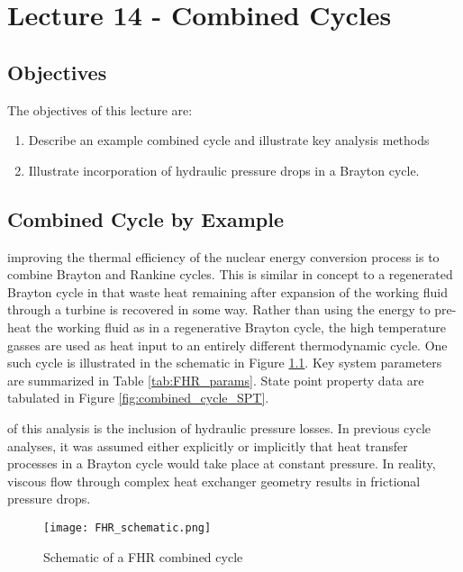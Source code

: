 \chapter{Lecture 14 - Combined Cycles}
\label{ch:ch14}
\section{Objectives}
The objectives of this lecture are:
\begin{enumerate}
\item Describe an example combined cycle and illustrate key analysis methods
\item Illustrate incorporation of hydraulic pressure drops in a Brayton cycle.
\end{enumerate}

\section{Combined Cycle by Example}
 improving the thermal efficiency of the nuclear energy conversion process is to combine Brayton and Rankine cycles.  This is similar in concept to a regenerated Brayton cycle in that waste heat remaining after expansion of the working fluid through a turbine is recovered in some way.  Rather than using the energy to pre-heat the working fluid as in a regenerative Brayton cycle, the high temperature gasses are used as heat input to an entirely different thermodynamic cycle.  One such cycle\cite{forsberg2014meeting} is illustrated in the schematic in Figure \ref{fig:FHR_schematic}.  Key system parameters are summarized in Table \ref{tab:FHR_params}.  State point property data are tabulated in Figure \ref{fig:combined_cycle_SPT}.

 of this analysis is the inclusion of hydraulic pressure losses.  In previous cycle analyses, it was assumed either explicitly or implicitly that heat transfer processes in a Brayton cycle would take place at constant pressure.  In reality, viscous flow through complex heat exchanger geometry results in frictional pressure drops.  



\begin{figure}
\texttt{[image: FHR\_schematic.png]}
\caption{Schematic of a FHR combined cycle}
\label{fig:FHR_schematic}
\end{figure}

